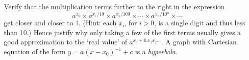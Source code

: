 \begin{questions}
  \question Verify that the multiplication terms further to the right in the expression
            \begin{displaymath}
              a^{x_0} \times a^{x_1/10} \times a^{x_2/100} \times \cdots \times a^{x_n/10^n} \times \cdots
            \end{displaymath}
            get closer and closer to 1. (Hint: each $ x_i $, for $ i > 0 $, is a single digit and thus less than 10.) Hence justify why only taking a few
            of the first terms usually gives a good approximation to the `real value' of $ a^{x_0 + 0.x_1x_2\dots} $.
  \question A graph with Cartesian equation of the form $ y = a(x - x_0)^{-1} + c $ is a \emph{hyperbola}.
\end{questions}

